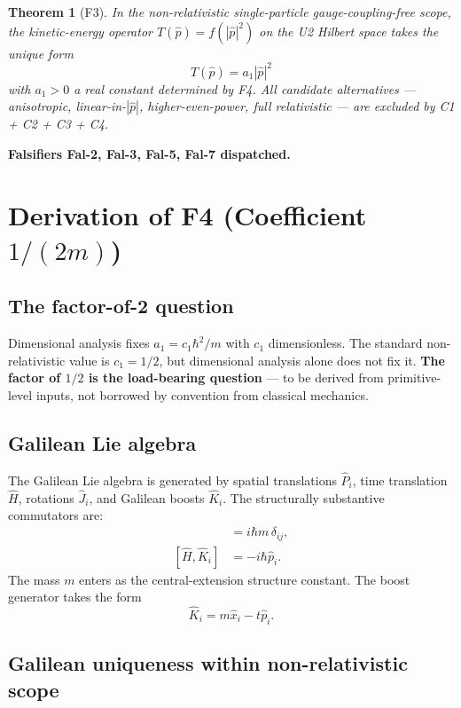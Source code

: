 \documentclass[11pt,a4paper]{article}
\newtheorem{theorem}{Theorem}[section]
\begin{document}
\begin{theorem}[F3]
In the non-relativistic single-particle gauge-coupling-free scope, the kinetic-energy operator $T(\hat{p}) = f(|\hat{p}|^2)$ on the U2 Hilbert space takes the unique form
\[
T(\hat{p}) = a_1 |\hat{p}|^2
\]
with $a_1 > 0$ a real constant determined by F4. All candidate alternatives --- anisotropic, linear-in-$|\hat{p}|$, higher-even-power, full relativistic --- are excluded by C1 + C2 + C3 + C4.
\end{theorem}

\textbf{Falsifiers Fal-2, Fal-3, Fal-5, Fal-7 dispatched.}

\section{Derivation of F4 (Coefficient $1/(2m)$)}\label{sec:F4}

\subsection{The factor-of-2 question}

Dimensional analysis fixes $a_1 = c_1 \hbar^2 / m$ with $c_1$ dimensionless. The standard non-relativistic value is $c_1 = 1/2$, but dimensional analysis alone does not fix it. \textbf{The factor of $1/2$ is the load-bearing question} --- to be derived from primitive-level inputs, not borrowed by convention from classical mechanics.

\subsection{Galilean Lie algebra}

The Galilean Lie algebra is generated by spatial translations $\hat{P}_i$, time translation $\hat{H}$, rotations $\hat{J}_i$, and Galilean boosts $\hat{K}_i$. The structurally substantive commutators are:
\begin{align}
[\hat{K}_i, \hat{P}_j] &= i \hbar m \, \delta_{ij}, \label{eq:KP}\\
[\hat{H}, \hat{K}_i] &= -i \hbar \hat{p}_i. \label{eq:HK}
\end{align}
The mass $m$ enters as the central-extension structure constant. The boost generator takes the form
\begin{equation}
\hat{K}_i = m \hat{x}_i - t \hat{p}_i. \label{eq:K}
\end{equation}

\subsection{Galilean uniqueness within non-relativistic scope}
\end{document}
